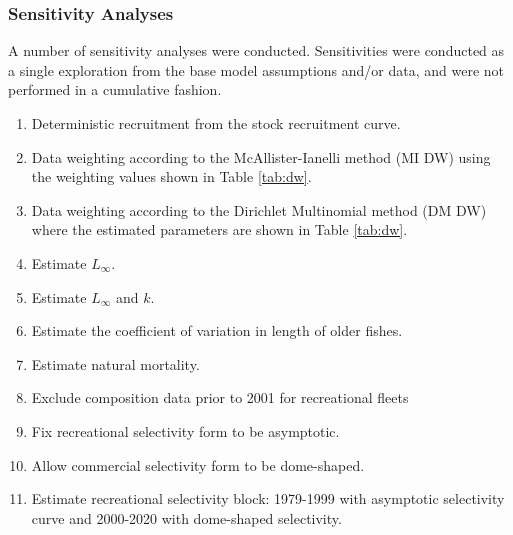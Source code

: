 \documentclass[11pt,
  english,
  a4paper,
]{article}
\begin{document}

\hypertarget{sensitivity-analyses}{%
\subsubsection{Sensitivity Analyses}\label{sensitivity-analyses}}

\leavevmode\tagmcend\tagstructend


A number of sensitivity analyses were conducted. Sensitivities were conducted as a single exploration from the base model assumptions and/or data, and were not performed in a cumulative fashion.

\leavevmode\tagmcend\tagstructend\par

\begin{enumerate}
   
  \item Deterministic recruitment from the stock recruitment curve. 

  \item Data weighting according to the McAllister-Ianelli method (MI DW) using the weighting values shown in Table \ref{tab:dw}. 
  
  \item Data weighting according to the Dirichlet Multinomial method (DM DW) where the estimated parameters are shown in Table \ref{tab:dw}. 

  \item Estimate $L_{\infty}$.
  
  \item Estimate $L_{\infty}$ and $k$.

  \item Estimate the coefficient of variation in length of older fishes.

  \item Estimate natural mortality.
  
  \item Exclude composition data prior to 2001 for recreational fleets

  \item Fix recreational selectivity form to be asymptotic. 
  
  \item Allow commercial selectivity form to be dome-shaped.

  \item Estimate recreational selectivity block: 1979-1999 with asymptotic selectivity curve and 2000-2020 with dome-shaped selectivity.   
  
\end{enumerate}
\end{document}

